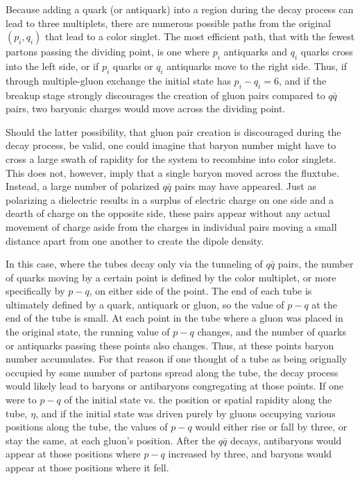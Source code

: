 \documentclass[aps, prc, 12pt, nofootinbib, showpacs, superscriptaddress, tightenlines, groupedaddress]{revtex4-2}
\begin{document}
Because adding a quark (or antiquark) into a region during the decay process can lead to three multiplets, there are numerous possible paths from the original $(p_i,q_i)$ that lead to a color singlet. The most efficient path, that with the fewest partons passing the dividing point, is one where $p_i$ antiquarks and $q_i$ quarks cross into the left side, or if $p_i$ quarks or $q_i$ antiquarks move to the right side. Thus, if through multiple-gluon exchange the initial state has $p_i-q_i=6$, and if the breakup stage strongly discourages the creation of gluon pairs compared to $q\bar{q}$ pairs, two baryonic charges would move across the dividing point. 

Should the latter possibility, that gluon pair creation is discouraged during the decay process, be valid, one could imagine that baryon number might have to cross a large swath of rapidity for the system to recombine into color singlets. This does not, however, imply that a single baryon moved across the fluxtube. Instead, a large number of polarized $q\bar{q}$ pairs may have appeared. Just as polarizing a dielectric results in a surplus of electric charge on one side and a dearth of charge on the opposite side, these pairs appear without any actual movement of charge aside from the charges in individual pairs moving a small distance apart from one another to create the dipole density.

In this case, where the tubes decay only via the tunneling of $q\bar{q}$ pairs, the number of quarks moving by a certain point is defined by the color multiplet, or more specifically by $p-q$, on either side of the point. The end of each tube is ultimately defined by a quark, antiquark or gluon, so the value of $p-q$ at the end of the tube is small. At each point in the tube where a gluon was placed in the original state, the running value of $p-q$ changes, and the number of quarks or antiquarks passing these points also changes. Thus, at these points baryon number accumulates. For that reason if one thought of a tube as being orignally occupied by some number of partons spread along the tube, the decay process would likely lead to baryons or antibaryons congregating at those points. If one were to $p-q$ of the initial state vs. the position or spatial rapidity along the tube, $\eta$, and if the initial state was driven purely by gluons occupying various positions along the tube, the values of $p-q$ would either rise or fall by three, or stay the same, at each gluon's position. After the $q\bar{q}$ decays, antibaryons would appear at those positions where $p-q$ increased by three, and baryons would appear at those positions where it fell. 
\end{document}
